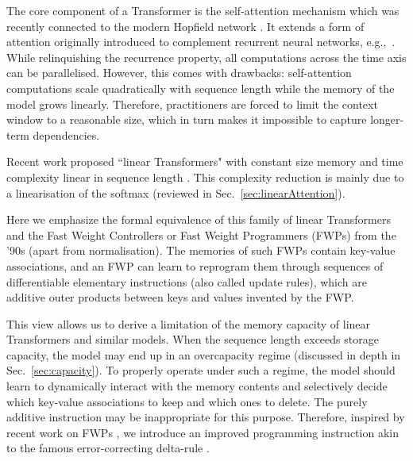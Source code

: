 \documentclass{article}
\theoremstyle{definition}
\begin{document}
The core component of a Transformer is the self-attention mechanism \citep{cheng16, ParikhT0U16, lin2017structured}
which was recently connected to the modern Hopfield network \citep{ramsauer2021hopfield, KrotovH16, demircigil2017model}.
It extends a form of attention \citep{bahdanau2014neural} 
originally introduced to complement recurrent neural networks, e.g.,~\citep{hochreiter1997long}. 
While relinquishing the recurrence property, all computations across the time axis
can be parallelised.
However, this comes with drawbacks:
self-attention computations scale quadratically with sequence length
while the memory of the model grows linearly.
Therefore, practitioners are forced to limit the context window to a reasonable size,
which in turn makes it impossible to capture longer-term dependencies.

Recent work proposed ``linear Transformers" with constant size memory and time
complexity linear in sequence length  \citep{katharopoulos2020transformers, choromanski2020rethinking, peng2021random, shen2018efficient}.
This complexity reduction is mainly due to 
 a linearisation of the softmax (reviewed in Sec.~\ref{sec:linearAttention}).

Here we emphasize the formal equivalence of this family of linear Transformers and the Fast Weight Controllers or Fast Weight Programmers (FWPs) 
from the '90s \citep{Schmidhuber:91fastweights, schmidhuber1992learning, schmidhuber1993reducing, schmidhuber2021fwp} (apart from normalisation). 
The memories of such FWPs contain key-value associations, and an FWP can learn to reprogram them through sequences of differentiable elementary instructions (also called update rules), which are additive outer products between keys and values invented by the FWP.

This view allows us to derive a limitation of the memory capacity of linear Transformers and similar models.
When the sequence length exceeds storage capacity, 
the model may end up in an overcapacity regime (discussed in depth in Sec.~\ref{sec:capacity}).
To properly operate under such a regime,
the model should learn to dynamically interact with the memory contents and selectively
decide which key-value associations to keep and which ones to delete.
The purely additive instruction may be inappropriate for this purpose.
Therefore, 
inspired by recent work on FWPs
\citep{schlag2020fastweightmemory}, we introduce an improved programming instruction
akin to the famous error-correcting delta-rule \citep{widrow1960adaptive}. 
\end{document}

